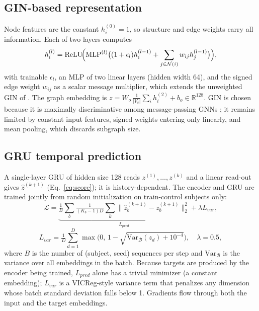 \documentclass[conference]{IEEEtran}
\begin{document}
\subsection{GIN-based representation}
Node features are the constant $h_i^{(0)}{=}1$, so structure and edge weights carry all information. Each of two layers computes
\begin{equation}
h_i^{(l)}=\mathrm{ReLU}\!\Bigl(\mathrm{MLP}^{(l)}\bigl((1+\epsilon_l)h_i^{(l-1)}+\sum_{j\in\mathcal{N}(i)}w_{ij}h_j^{(l-1)}\bigr)\Bigr),
\label{eq:gin}
\end{equation}
with trainable $\epsilon_l$, an MLP of two linear layers (hidden width 64), and the signed edge weight $w_{ij}$ as a scalar message multiplier, which extends the unweighted GIN of \cite{xu2019gin}. The graph embedding is $z=W_o\,\frac{1}{|V_v|}\sum_i h_i^{(2)}+b_o\in\mathbb{R}^{128}$. GIN is chosen because it is maximally discriminative among message-passing GNNs \cite{xu2019gin}; it remains limited by constant input features, signed weights entering only linearly, and mean pooling, which discards subgraph size.

\subsection{GRU temporal prediction}
A single-layer GRU of hidden size 128 \cite{cho2014} reads $z^{(1)},\dots,z^{(k)}$ and a linear read-out gives $\hat z^{(k+1)}$ (Eq.~\ref{eq:score}); it is history-dependent. The encoder and GRU are trained jointly from random initialization on train-control subjects only:
\begin{equation}
\mathcal{L}=\underbrace{\tfrac{1}{B}\sum_{b}\tfrac{1}{(K_b-1)D}\sum_{k}\|\hat z_b^{(k+1)}-z_b^{(k+1)}\|_2^2}_{L_{pred}}+\lambda L_{var},
\label{eq:loss}
\end{equation}
\begin{equation}
L_{var}=\tfrac{1}{D}\sum_{d=1}^{D}\max\bigl(0,\,1-\sqrt{\mathrm{Var}_{\mathcal{B}}(z_d)+10^{-4}}\bigr),\quad \lambda=0.5 ,
\end{equation}
where $B$ is the number of (subject, seed) sequences per step and $\mathrm{Var}_{\mathcal{B}}$ is the variance over all embeddings in the batch. Because targets are produced by the encoder being trained, $L_{pred}$ alone has a trivial minimizer (a constant embedding); $L_{var}$ is a VICReg-style variance term \cite{bardes2022} that penalizes any dimension whose batch standard deviation falls below 1. Gradients flow through both the input and the target embeddings.
\end{document}
